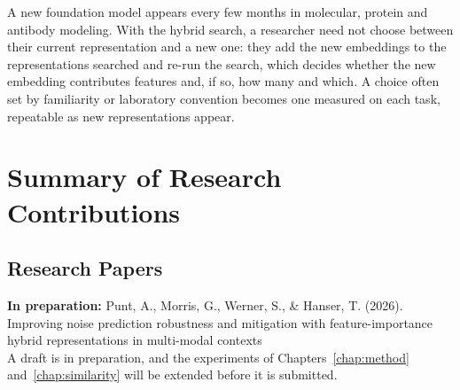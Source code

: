 A new foundation model appears every few months in molecular, protein and antibody modeling. With the hybrid search, a researcher need not choose between their current representation and a new one: they add the new embeddings to the representations searched and re-run the search, which decides whether the new embedding contributes features and, if so, how many and which. A choice often set by familiarity or laboratory convention becomes one measured on each task, repeatable as new representations appear.


\pagebreak
\chapter*{Summary of Research Contributions}


\section*{Research Papers}

\textbf{In preparation:} Punt, A., Morris, G., Werner, S., \& Hanser, T. (2026). Improving noise prediction robustness and mitigation with feature-importance hybrid representations in multi-modal contexts \\ A draft is in preparation, and the experiments of Chapters~\ref{chap:method} and~\ref{chap:similarity} will be extended before it is submitted.

